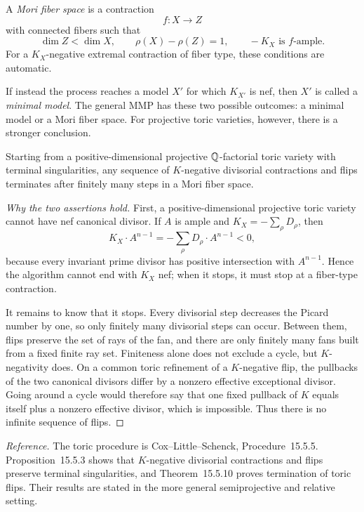 \begin{definition}
A \emph{Mori fiber space} is a contraction
\[
f:X\longrightarrow Z
\]
with connected fibers such that
\[
\dim Z<\dim X,
\qquad
\rho(X)-\rho(Z)=1,
\qquad
-K_X\text{ is }f\text{-ample}.
\]
For a \(K_X\)-negative extremal contraction of fiber type, these
conditions are automatic.
\end{definition}

If instead the process reaches a model \(X'\) for which \(K_{X'}\) is
nef, then \(X'\) is called a \emph{minimal model}.  The general MMP has
these two possible outcomes: a minimal model or a Mori fiber space.
For projective toric varieties, however, there is a stronger conclusion.

\begin{theorem}
\label{thm:projective-toric-mmp}
Starting from a positive-dimensional projective \(\mathbb{Q}\)-factorial toric
variety with terminal singularities, any sequence of \(K\)-negative
divisorial contractions and flips terminates after finitely many steps
in a Mori fiber space.
\end{theorem}

\begin{proof}[Why the two assertions hold]
First, a positive-dimensional projective toric variety cannot have nef
canonical divisor.  If \(A\) is ample and
\(K_X=-\sum_{\rho}D_\rho\), then
\[
K_X\cdot A^{n-1}
=
-\sum_\rho D_\rho\cdot A^{n-1}<0,
\]
because every invariant prime divisor has positive intersection with
\(A^{n-1}\).  Hence the algorithm cannot end with \(K_X\) nef; when it
stops, it must stop at a fiber-type contraction.

It remains to know that it stops.  Every divisorial step decreases the
Picard number by one, so only finitely many divisorial steps can occur.
Between them, flips preserve the set of rays of the fan, and there are
only finitely many fans built from a fixed finite ray set.  Finiteness
alone does not exclude a cycle, but \(K\)-negativity does.  On a common
toric refinement of a \(K\)-negative flip, the pullbacks of the two
canonical divisors differ by a nonzero effective exceptional divisor.
Going around a cycle would therefore say that one fixed pullback of
\(K\) equals itself plus a nonzero effective divisor, which is
impossible.  Thus there is no infinite sequence of flips.
\end{proof}

\noindent
\textit{Reference.}
The toric procedure is Cox--Little--Schenck,
Procedure~15.5.5.  Proposition~15.5.3 shows that \(K\)-negative
divisorial contractions and flips preserve terminal singularities, and
Theorem~15.5.10 proves termination of toric flips.  Their results are
stated in the more general semiprojective and relative setting.

